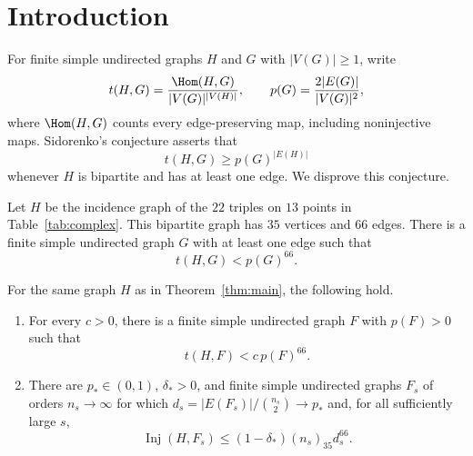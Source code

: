 \begin{abstract}
We disprove Sidorenko's conjecture with a bipartite graph on \(35\) vertices
and \(66\) edges: its homomorphism density in some finite simple graph is
smaller than the conjectured lower bound. The same connected graph also
disproves the forcing conjecture: at one fixed density, asymptotically
matching the edge and pattern densities does not imply quasirandomness.
\end{abstract}
\section{Introduction}\label{sec:introduction}

For finite simple undirected graphs \(H\) and \(G\) with
\(|V(G)|\ge1\), write
\[
t(H,G)=\frac{\Hom(H,G)}{|V(G)|^{|V(H)|}},
\qquad
p(G)=\frac{2|E(G)|}{|V(G)|^2},
\]
where \(\Hom(H,G)\) counts every edge-preserving map, including
noninjective maps. Sidorenko's conjecture asserts that
\begin{equation}\label{eq:sidorenko}
t(H,G)\ge p(G)^{|E(H)|}
\end{equation}
whenever \(H\) is bipartite and has at least one edge.
We disprove this conjecture.

\begin{theorem}\label{thm:main}
Let \(H\) be the incidence graph of the \(22\) triples on \(13\) points
in Table~\ref{tab:complex}. This bipartite graph has \(35\) vertices
and \(66\) edges. There is a finite simple undirected graph \(G\)
with at least one edge such that
\[
t(H,G)<p(G)^{66}.
\]
\end{theorem}
\begin{corollary}
\label{cor:amplification}
For the same graph \(H\) as in Theorem~\ref{thm:main}, the following
hold.
\begin{enumerate}[label=(\roman*)]
\item For every \(c>0\), there is a finite simple undirected graph
\(F\) with \(p(F)>0\) such that
\[
t(H,F)<c\,p(F)^{66}.
\]
\item There are \(p_*\in(0,1)\), \(\delta_*>0\), and finite simple
undirected graphs \(F_s\) of orders \(n_s\to\infty\) for which
\(d_s=|E(F_s)|/\binom{n_s}{2}\to p_*\) and, for all sufficiently
large \(s\),
\[
\operatorname{Inj}(H,F_s)
\le(1-\delta_*)(n_s)_{35}d_s^{66}.
\]
\end{enumerate}
\end{corollary}

